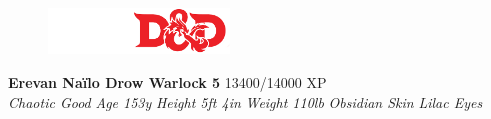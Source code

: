 \documentclass[letterpaper]{article}
\newcommand{\e}[1]{\emph{#1}}
\newcommand{\B}[1]{\textbf{#1}}
\begin{document}
\sffamily
\begin{figure}
    \vspace{-1.5em}
    \includegraphics[width=13em]{5e}
\end{figure}
\B{\huge{Erevan Na\"ilo} \Large{Drow Warlock 5}} \hspace{1em} 13400/14000 XP \\
\e{Chaotic Good} \hspace{1em} \e{Age 153y} \hspace{1em} \e{Height 5ft 4in} \hspace{1em} \e{Weight 110lb} \hspace{1em} \e{Obsidian Skin} \hspace{1em} \e{Lilac Eyes} \par
\end{document}
